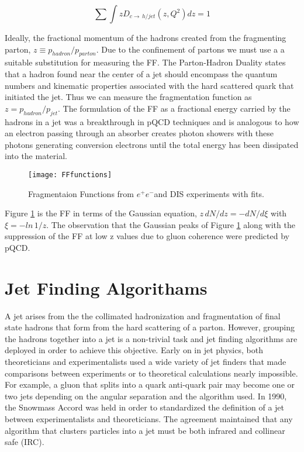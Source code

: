 \begin{equation}
\sum \int z D_{c \rightarrow \, h/jet} (z,Q^{2})dz = 1
\label{eq:FFRule}
\end{equation}

\noindent
Ideally, the fractional momentum of the hadrons created from the fragmenting parton, $z \equiv p_{hadron} / p_{parton}$.  Due to the confinement of partons we must use a a suitable substitution for measuring the FF.  The Parton-Hadron Duality\cite{Jenkovszky:2012dc} states that a hadron found near the center of a jet should encompass the quantum numbers and kinematic properties associated with the hard scattered quark that initiated the jet.  Thus we can measure the fragmentation function as $z = p_{hadron} / p_{jet}$.  The formulation of the FF as a fractional energy carried by the hadrons in a jet was a breakthrough in pQCD techniques and is analogous to how an electron passing through an absorber creates photon showers with these photons generating conversion electrons until the total energy has been dissipated into the material.

\begin{figure}[h]
\texttt{[image: FFfunctions]}
\centering
\caption{Fragmentaion Functions from $e^{+}e^{-}$and DIS experiments with fits\cite{rak_tannenbaum_2013}.}
\label{fig:FFfunc}
\end{figure}


Figure \ref{fig:FFfunc} is the FF in terms of the Gaussian equation, $z \, dN/dz = - dN /d \xi $ with $\xi = -ln  \,1/z$. The observation that the Gaussian peaks of Figure \ref{fig:FFfunc} along with the suppression of the FF at low z values due to gluon coherence were predicted by pQCD. 

\section{Jet Finding Algorithams}

A jet arises from the the collimated hadronization and fragmentation of final state hadrons that form from the hard scattering of a parton.  However, grouping the hadrons together into a jet is a non-trivial task and jet finding algorithms are deployed in order to achieve this objective.  Early on in jet physics, both theoreticians and experimentalists used a wide variety of jet finders that made comparisons between experiments or to theoretical calculations nearly impossible\cite{Atkin:2015msa}.  For example, a gluon that splits into a quark anti-quark pair may become one or two jets depending on the angular separation and the algorithm used.  In 1990, the Snowmass Accord\cite{Huth:217490} was held in order to standardized the definition of a jet between experimentalists and theoreticians.  The agreement maintained that any algorithm that clusters particles into a jet must be both infrared and collinear safe (IRC).  

